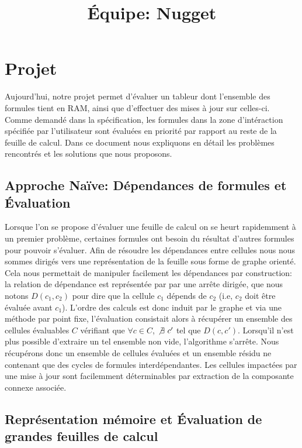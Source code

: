 \documentclass[9pt]{article}
\title{Équipe: Nugget}
\begin{document}
\maketitle

\section{Projet}

Aujourd'hui, notre projet permet d'évaluer un tableur dont l'ensemble des formules
tient en RAM, ainsi que d'effectuer des mises à jour sur celles-ci.
Comme demandé dans la spécification, les formules dans la zone d'intéraction spécifiée
par l'utilisateur sont évaluées en priorité par rapport au reste de la feuille de calcul.
Dans ce document nous expliquons en détail les problèmes rencontrés et les
solutions que nous proposons.

\subsection{Approche Naïve: Dépendances de formules et Évaluation}

Lorsque l'on se propose d'évaluer une feuille de calcul on se
heurt rapidemment à un premier problème, certaines formules
ont besoin du résultat d'autres formules pour pouvoir s'évaluer.
Afin de résoudre les dépendances entre cellules nous nous sommes
dirigés vers une représentation de la feuille sous forme de graphe orienté.
Cela nous permettait de manipuler facilement les dépendances par
construction: la relation de dépendance est représentée par
par une arrête dirigée, que nous notons $D(c_1,c_2)$ pour dire que
la cellule $c_1$ dépends de $c_2$ (i.e, $c_2$ doit être évaluée
avant $c_1$).
L'ordre des calculs est donc induit par le graphe et
via une méthode par point fixe, l'évaluation
consistait alors à récupérer un ensemble des cellules évaluables $C$ vérifiant
que $\forall c \in C$, $\not\exists\ c'$ tel que $D(c,c')$.
Lorsqu'il n'est plus possible d'extraire un tel ensemble non vide,
l'algorithme s'arrête.
Nous récupérons donc un ensemble de cellules évaluées et un ensemble résidu ne
contenant que des cycles de formules interdépendantes. Les cellules impactées par une
mise à jour sont facilemment déterminables par extraction de la composante connexe associée.

\subsection{Représentation mémoire et Évaluation de grandes feuilles de calcul}
\end{document}
